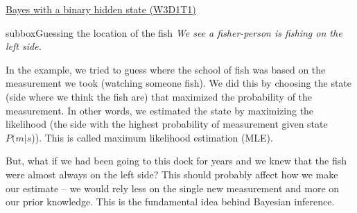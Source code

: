\begin{textbox}{\href{https://compneuro.neuromatch.io/tutorials/W3D1_BayesianDecisions/student/W3D1_Tutorial1.html}{Bayes with a binary hidden state (W3D1T1)} }
\begin{subbox}{subbox}{Guessing the location of the fish}
\textit{We see a fisher-person is fishing on the left side.}
 
In the example, we tried to guess where the school of fish was based on the measurement we took (watching someone fish). We did this by choosing the state (side where we think the fish are) that maximized the probability of the measurement. In other words, we estimated the state by maximizing the likelihood (the side with the highest probability of measurement given state $P(m|s$)). This is called maximum likelihood estimation (MLE).

But, what if we had been going to this dock for years and we knew that the fish were almost always on the left side? This should probably affect how we make our estimate -- we would rely less on the single new measurement and more on our prior knowledge. This is the fundamental idea behind Bayesian inference.

\end{subbox}

\end{textbox}
